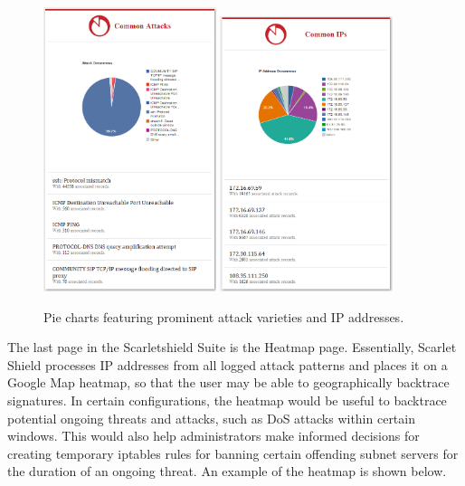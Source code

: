 \documentclass[12pt,letterpaper,titlepage]{report}
\begin{document}
{\begin{figure}[h]
\centering
\includegraphics[width=0.45\textwidth]{attackpie.png}\hfill
\includegraphics[width=0.45\textwidth]{ippie.png}
\caption{Pie charts featuring prominent attack varieties and IP addresses.}
\end{figure}

The last page in the Scarletshield Suite is the Heatmap page. Essentially,
Scarlet Shield processes IP addresses from all logged attack patterns and places
it on a Google Map heatmap, so that the user may be able to geographically
backtrace signatures.  In certain configurations, the heatmap would be useful to
backtrace potential ongoing threats and attacks, such as DoS attacks within
certain windows.  This would also help administrators make informed decisions
for creating temporary iptables rules for banning certain offending subnet
servers for the duration of an ongoing threat. An example of the heatmap is
shown below. 

}
\end{document}
